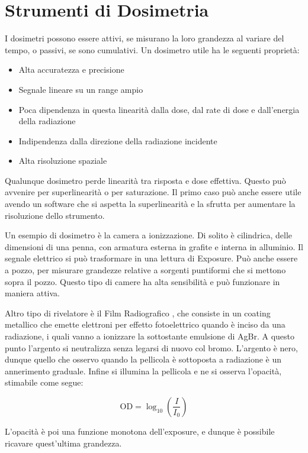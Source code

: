 \documentclass [a4paper, twoside] {book}
\begin{document}
\section{Strumenti di Dosimetria} 

I dosimetri possono essere attivi, se misurano la loro grandezza al variare del tempo, o passivi, se sono cumulativi. Un dosimetro utile ha le seguenti proprietà:
\begin{itemize}
\item Alta accuratezza e precisione
\item Segnale lineare su un range ampio
\item Poca dipendenza in questa linearità dalla dose, dal rate di dose e dall'energia della radiazione
\item Indipendenza dalla direzione della radiazione incidente
\item Alta risoluzione spaziale
\end{itemize}

Qualunque dosimetro perde linearità tra risposta e dose effettiva. Questo può avvenire per superlinearità o per saturazione. Il primo caso può anche essere utile avendo un software che si aspetta la superlinearità e la sfrutta per aumentare la risoluzione dello strumento.

Un esempio di dosimetro è la camera a ionizzazione. Di solito è cilindrica, delle dimensioni di una penna, con armatura esterna in grafite e interna in alluminio. Il segnale elettrico si può trasformare in una lettura di Exposure. Può anche essere a pozzo, per misurare grandezze relative a sorgenti puntiformi che si mettono sopra il pozzo. Questo tipo di camere ha alta sensibilità e può funzionare in maniera attiva.

Altro tipo di rivelatore è il Film Radiografico \cite{Films}, che consiste in un coating metallico che emette elettroni per effetto fotoelettrico quando è inciso da una radiazione, i quali vanno a ionizzare la sottostante emulsione di AgBr. A questo punto l'argento si neutralizza senza legarsi di nuovo col bromo. L'argento è nero, dunque quello che osservo quando la pellicola è sottoposta a radiazione è un annerimento graduale.
Infine si illumina la pellicola e ne si osserva l'opacità, stimabile come segue:

\begin{equation}
\text{OD}=\log_{10}\left(\frac{I}{I_0}\right)
\end{equation}

L'opacità è poi una funzione monotona dell'exposure, e dunque è possibile ricavare quest'ultima grandezza.
\end{document}
